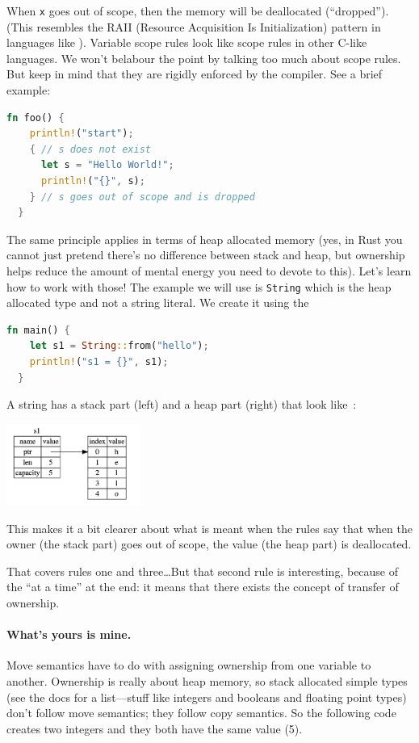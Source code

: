 When \texttt{x} goes out of scope, then the memory will be deallocated (``dropped''). (This resembles the RAII (Resource Acquisition Is Initialization) pattern in languages like \CPP). Variable scope rules look like scope rules in other C-like languages. We won't belabour the point by talking too much about scope rules. But keep in mind that they are rigidly enforced by the compiler. See a brief example:
\begin{lstlisting}[language=Rust]
  fn foo() {
    println!("start");
    { // s does not exist
      let s = "Hello World!";
      println!("{}", s);
    } // s goes out of scope and is dropped
  }
\end{lstlisting}

The same principle applies in terms of heap allocated memory (yes, in Rust you cannot just pretend there's no difference between stack and heap, but ownership helps reduce the amount of mental energy you need to devote to this). Let's learn how to work with those! The example we will use is \texttt{String} which is the heap allocated type and not a string literal. We create it using the 
\begin{lstlisting}[language=Rust]
  fn main() {
    let s1 = String::from("hello");
    println!("s1 = {}", s1);
  }
\end{lstlisting}

A string has a stack part (left) and a heap part (right) that look like~\cite{rustdocs}:
\begin{center}
\includegraphics[width=0.33\textwidth]{images/string.png} 
\end{center}

This makes it a bit clearer about what is meant when the rules say that when the owner (the stack part) goes out of scope, the value (the heap part) is deallocated.

That covers rules one and three\ldots But that second rule is interesting, because of the ``at a time'' at the end: it means that there exists the concept of transfer of ownership. 

\paragraph{What's yours is mine.}
Move semantics have to do with assigning ownership from one variable to another. Ownership is really about heap memory, so stack allocated simple types (see the docs for a list---stuff like integers and booleans and floating point types) don't follow move semantics; they follow copy semantics. So the following code creates two integers and they both have the same value (5).

